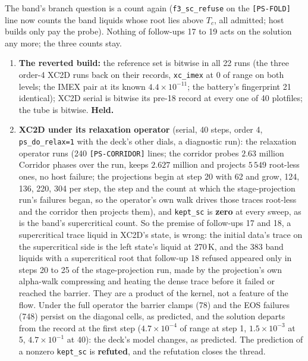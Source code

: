 \documentclass[11pt,a4paper]{article}
\newcommand{\code}[1]{\texttt{\small #1}}
\begin{document}
The band's branch question is a count again (\code{f3\_sc\_refuse} on
the \code{[PS-FOLD]} line now counts the band liquids whose root lies
above $T_c$, all admitted; host builds only pay the probe).  Nothing of
follow-ups 17 to 19 acts on the solution any more; the three counts
stay.
\begin{enumerate}[nosep]
\item \textbf{The reverted build:} the reference set is bitwise in all 22 runs (the three order-4 XC2D runs back on their records, \code{xc\_imex} at $0$ of range on both levels; the IMEX pair at its known $4.4\times10^{-11}$; the battery's fingerprint 21 identical); XC2D serial is bitwise its pre-18 record at every one of 40 plotfiles; the tube is bitwise.  \textbf{Held.}
\item \textbf{XC2D under its relaxation operator} (serial, 40 steps,
      order 4, \code{ps\_do\_relax=1} with the deck's other dials, a
      diagnostic run): the relaxation operator runs (240 \code{[PS-CORRIDOR]} lines; the
      corridor probes $2.63$ million Corridor phases over the run, keeps
      $2.627$ million and projects $5\,549$ root-less ones, no host
      failure; the projections begin at step 20 with 62 and grow, 124,
      136, 220, 304 per step, the step and the count at which the
      stage-projection run's failures began, so the operator's own walk
      drives those traces root-less and the corridor then projects them), and \code{kept\_sc} is \textbf{zero} at every sweep, as
      is the band's supercritical count.  So the premise of follow-ups
      17 and 18, a supercritical trace liquid in XC2D's state, is
      wrong: the initial data's trace on the supercritical side is the
      left state's liquid at 270\,K, and the 383 band liquids with a
      supercritical root that follow-up 18 refused appeared only in
      steps 20 to 25 of the stage-projection run, made by the
      projection's own alpha-walk compressing and heating the dense trace
      before it failed or reached the barrier.  They are a product of the
      kernel, not a feature of the flow.  Under the full operator the
      barrier clamps (78) and the EOS failures (748) persist on the
      diagonal cells, as predicted, and the solution departs from the
      record at the first step ($4.7\times10^{-4}$ of range at step 1,
      $1.5\times10^{-3}$ at 5, $4.7\times10^{-1}$ at 40): the deck's
      model changes, as predicted.  The prediction of a nonzero
      \code{kept\_sc} is \textbf{refuted}, and the refutation closes the
      thread.
\end{enumerate}
\end{document}
